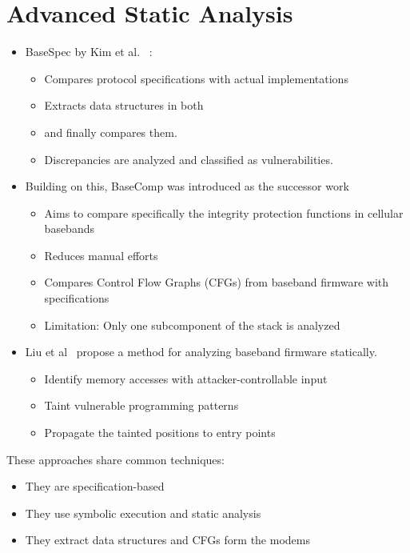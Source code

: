 \documentclass[a4paper,11pt,oneside]{report}
\begin{document}
\section{Advanced Static Analysis}
\begin{itemize}
  \item BaseSpec by Kim et al. ~\cite{Kim21}:
    \begin{itemize}
      \item Compares protocol specifications with actual implementations
      \item Extracts data structures in both
      \item and finally compares them.
      \item Discrepancies are analyzed and classified as vulnerabilities.
    \end{itemize}
  \item Building on this, BaseComp was introduced as the successor work~\cite{Kim23}
    \begin{itemize}
      \item Aims to compare specifically the integrity protection functions in cellular basebands
      \item Reduces manual efforts
      \item Compares Control Flow Graphs (CFGs) from baseband firmware with specifications
      \item Limitation: Only one subcomponent of the stack is analyzed
    \end{itemize}
  \item Liu et al~\cite{Liu24} propose a method for analyzing baseband firmware statically.
    \begin{itemize}
      \item Identify memory accesses with attacker-controllable input
      \item Taint vulnerable programming patterns 
      \item Propagate the tainted positions to entry points
    \end{itemize}
\end{itemize}

These approaches share common techniques:
\begin{itemize}
  \item They are specification-based
  \item They use symbolic execution and static analysis
  \item They extract data structures and CFGs form the modems
\end{itemize}
\end{document}
